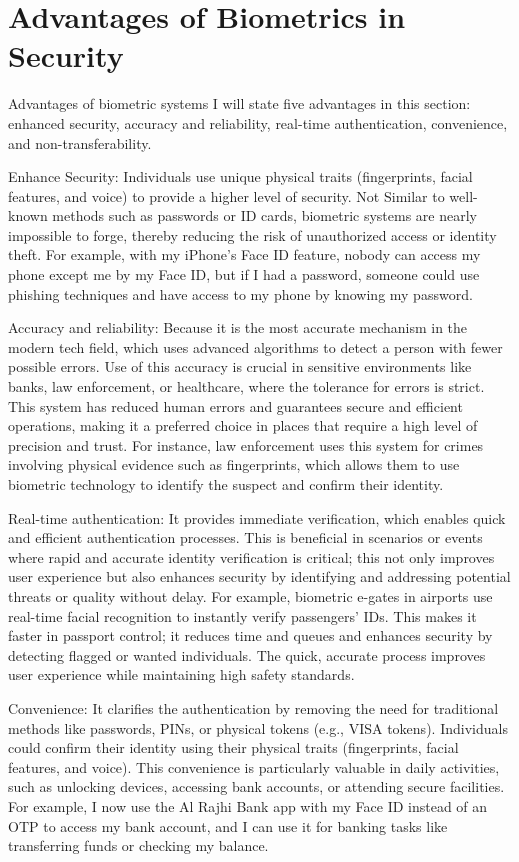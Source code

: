 \documentclass[conference]{IEEEtran}
\begin{document}
\section{Advantages of Biometrics in Security}

Advantages of biometric systems I will state five advantages in this section: enhanced security, accuracy and reliability, real-time authentication, convenience, and non-transferability.
 
Enhance Security: Individuals use unique physical traits (fingerprints, facial features, and voice) to provide a higher level of security. Not Similar to well-known methods such as passwords or ID cards, biometric systems are nearly impossible to forge, thereby reducing the risk of unauthorized access or identity theft. For example, with my iPhone's Face ID feature, nobody can access my phone except me by my Face ID, but if I had a password, someone could use phishing techniques and have access to my phone by knowing my password.
 
Accuracy and reliability: Because it is the most accurate mechanism in the modern tech field, which uses advanced algorithms to detect a person with fewer possible errors. Use of this accuracy is crucial in sensitive environments like banks, law enforcement, or healthcare, where the tolerance for errors is strict. This system has reduced human errors and guarantees secure and efficient operations, making it a preferred choice in places that require a high level of precision and trust. For instance, law enforcement uses this system for crimes involving physical evidence such as fingerprints, which allows them to use biometric technology to identify the suspect and confirm their identity.
 
Real-time authentication: It provides immediate verification, which enables quick and efficient authentication processes. This is beneficial in scenarios or events where rapid and accurate identity verification is critical; this not only improves user experience but also enhances security by identifying and addressing potential threats or quality without delay. For example, biometric e-gates in airports use real-time facial recognition to instantly verify passengers’ IDs. This makes it faster in passport control; it reduces time and queues and enhances security by detecting flagged or wanted individuals. The quick, accurate process improves user experience while maintaining high safety standards.
 
Convenience: It clarifies the authentication by removing the need for traditional methods like passwords, PINs, or physical tokens (e.g., VISA tokens). Individuals could confirm their identity using their physical traits (fingerprints, facial features, and voice). This convenience is particularly valuable in daily activities, such as unlocking devices, accessing bank accounts, or attending secure facilities. For example, I now use the Al Rajhi Bank app with my Face ID instead of an OTP to access my bank account, and I can use it for banking tasks like transferring funds or checking my balance.
 
\end{document}
